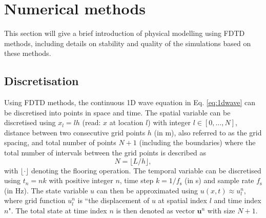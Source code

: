 \section{Numerical methods}\label{sec:FDTD}
This section will give a brief introduction of physical modelling using FDTD methods, including details on stability and quality of the simulations based on these methods.

\subsection{Discretisation}
Using FDTD methods, the continuous 1D wave equation in Eq. \eqref{eq:1dwave} can be discretised into points in space and time. The spatial variable can be discretised using $x_l = lh$ (read: $x$ at location $l$) with integer $l \in [0, \hdots, N]$, distance between two consecutive grid points $h$ (in m), also referred to as the grid spacing, and total number of points $N + 1$ (including the boundaries) where the total number of intervals between the grid points is described as
\begin{equation}\label{eq:numberOfIntervals}
    N = \lfloor L/h\rfloor,
\end{equation}
with $\lfloor \cdot \rfloor$ denoting the flooring operation. The temporal variable can be discretised using $t_n = nk$ with positive integer $n$, time step $k = 1/f_\text{s}$ (in s) and sample rate $f_\text{s}$ (in Hz). The state variable $u$ can then be approximated using $u(x,t) \approx u_l^n$, where grid function $u_l^n$ is ``the displacement of $u$ at spatial index $l$ and time index $n$". The total state at time index $n$ is then denoted as vector $\mathbf{u}^n$ with size $N+1$.

